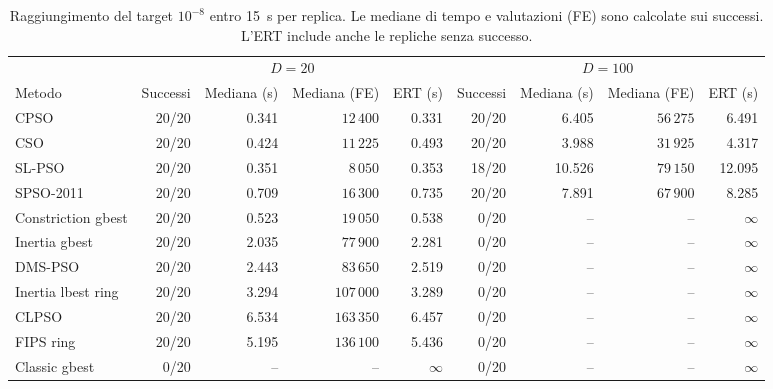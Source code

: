 \begin{table}[!htbp]
\centering\small
\caption{Raggiungimento del target $10^{-8}$ entro 15~s per replica. Le mediane di tempo e valutazioni (FE) sono calcolate sui successi. L'ERT include anche le repliche senza successo.}
\label{tab:study3-time-to-target}
\begin{tabular}{@{}lrrrr@{\hspace{1.5em}}rrrr@{}}
\toprule
 & \multicolumn{4}{c}{$D=20$} & \multicolumn{4}{c}{$D=100$} \\
\cmidrule(lr){2-5}\cmidrule(l){6-9}
Metodo & Successi & Mediana (s) & Mediana (FE) & ERT (s) & Successi & Mediana (s) & Mediana (FE) & ERT (s) \\
\midrule
CPSO & 20/20 & 0.341 & $12\,400$ & 0.331 & 20/20 & 6.405 & $56\,275$ & 6.491 \\
CSO & 20/20 & 0.424 & $11\,225$ & 0.493 & 20/20 & 3.988 & $31\,925$ & 4.317 \\
SL-PSO & 20/20 & 0.351 & $8\,050$ & 0.353 & 18/20 & 10.526 & $79\,150$ & 12.095 \\
SPSO-2011 & 20/20 & 0.709 & $16\,300$ & 0.735 & 20/20 & 7.891 & $67\,900$ & 8.285 \\
Constriction gbest & 20/20 & 0.523 & $19\,050$ & 0.538 & 0/20 & -- & -- & $\infty$ \\
Inertia gbest & 20/20 & 2.035 & $77\,900$ & 2.281 & 0/20 & -- & -- & $\infty$ \\
DMS-PSO & 20/20 & 2.443 & $83\,650$ & 2.519 & 0/20 & -- & -- & $\infty$ \\
Inertia lbest ring & 20/20 & 3.294 & $107\,000$ & 3.289 & 0/20 & -- & -- & $\infty$ \\
CLPSO & 20/20 & 6.534 & $163\,350$ & 6.457 & 0/20 & -- & -- & $\infty$ \\
FIPS ring & 20/20 & 5.195 & $136\,100$ & 5.436 & 0/20 & -- & -- & $\infty$ \\
Classic gbest & 0/20 & -- & -- & $\infty$ & 0/20 & -- & -- & $\infty$ \\
\bottomrule
\end{tabular}
\end{table}
